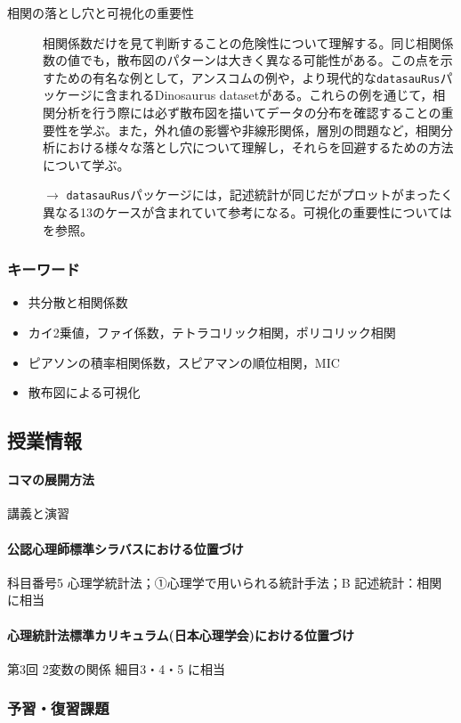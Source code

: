 \begin{description}
	\item[相関の落とし穴と可視化の重要性] 相関係数だけを見て判断することの危険性について理解する。同じ相関係数の値でも，散布図のパターンは大きく異なる可能性がある。この点を示すための有名な例として，アンスコムの例や，より現代的な\texttt{datasauRus}パッケージに含まれるDinosaurus datasetがある。これらの例を通じて，相関分析を行う際には必ず散布図を描いてデータの分布を確認することの重要性を学ぶ。また，外れ値の影響や非線形関係，層別の問題など，相関分析における様々な落とし穴について理解し，それらを回避するための方法について学ぶ。
	      \begin{flushright}
		      $\to$ \verb|datasauRus|パッケージには，記述統計が同じだがプロットがまったく異なる13のケースが含まれていて参考になる。可視化の重要性については\textcite{Kieran2018}を参照。
	      \end{flushright}
\end{description}

\subsubsection{キーワード}
\begin{itemize}
	\item 共分散と相関係数
	\item カイ2乗値，ファイ係数，テトラコリック相関，ポリコリック相関
	\item ピアソンの積率相関係数，スピアマンの順位相関，MIC
	\item 散布図による可視化
\end{itemize}

\subsection{授業情報}
\paragraph{コマの展開方法}
講義と演習
\paragraph{公認心理師標準シラバスにおける位置づけ}
科目番号5 心理学統計法；①心理学で用いられる統計手法；B 記述統計：相関 に相当
\paragraph{心理統計法標準カリキュラム(日本心理学会)における位置づけ}
第3回 2変数の関係 細目3・4・5 に相当
\subsubsection{予習・復習課題}
